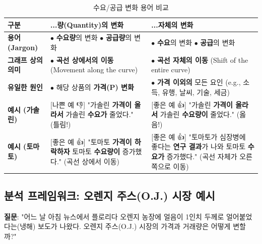 \documentclass[11pt,a4paper]{book}
\theoremstyle{definition}
\begin{document}
\begin{table}[h!]
\centering
\caption{수요/공급 변화 용어 비교}
\label{tab:shift_vs_move}
\begin{tabularx}{\textwidth}{>{\raggedright}p{3.5cm} >{\raggedright}X >{\raggedright}X}
\toprule
\textbf{구분} & \textbf{...량(Quantity)의 변화} & \textbf{...자체의 변화} \\
\midrule
\textbf{용어 (Jargon)} & $\bullet$ \textbf{수요량}의 변화 \newline $\bullet$ \textbf{공급량}의 변화 & $\bullet$ \textbf{수요}의 변화 \newline $\bullet$ \textbf{공급}의 변화 \\
\textbf{그래프 상의 의미} & $\bullet$ \textbf{곡선 상에서의 이동} \newline (Movement along the curve) & $\bullet$ \textbf{곡선 자체의 이동} \newline (Shift of the entire curve) \\
\textbf{유일한 원인} & $\bullet$ 해당 상품의 \textbf{가격(P) 변화} & $\bullet$ \textbf{가격 이외의} 모든 요인 \newline (e.g., 소득, 유행, 날씨, 기술, 세금) \\
\textbf{예시 (가솔린)} & [나쁜 예 👎] \newline "가솔린 \textbf{가격이 올라서} 가솔린 \textbf{수요가} 줄었다." \newline (틀림!) & [좋은 예 👍] \newline "가솔린 \textbf{가격이 올라서} 가솔린 \textbf{수요량이} 줄었다." \newline (옳음!) \\
\textbf{예시 (토마토)} & [좋은 예 👍] \newline "토마토 \textbf{가격이 하락하자} 토마토 \textbf{수요량이} 증가했다." \newline (곡선 상에서 이동) & [좋은 예 👍] \newline "토마토가 심장병에 좋다는 \textbf{연구 결과}가 나와 토마토 \textbf{수요가} 증가했다." \newline (곡선 자체가 오른쪽으로 이동) \\
\bottomrule
\end{tabularx}
\end{table}

\subsection{분석 프레임워크: 오렌지 주스(O.J.) 시장 예시}

\textbf{질문}: "어느 날 아침 뉴스에서 플로리다 오렌지 농장에 얼음이 1인치 두께로 얼어붙었다는(냉해) 보도가 나왔다. 오렌지 주스(O.J.) 시장의 가격과 거래량은 어떻게 변할까?"
\end{document}
